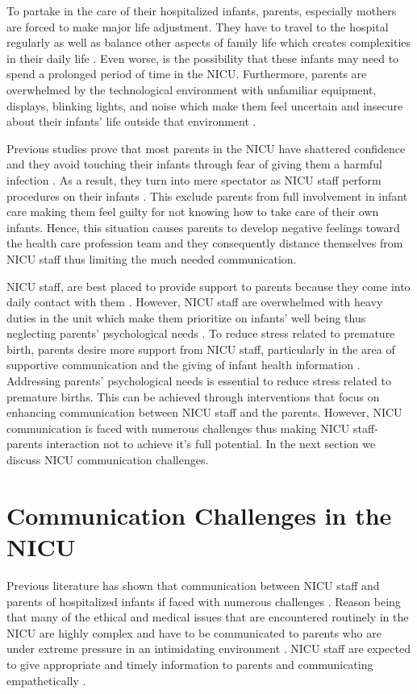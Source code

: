 To partake in the care of their hospitalized infants, parents, especially mothers are forced to make major life adjustment. They have to travel to the hospital regularly as well as balance other aspects of family life which creates complexities in their daily life \citep{Heidari2015a}. Even worse, is the possibility that these infants may need  to  spend  a  prolonged  period  of  time  in  the  NICU. Furthermore, parents are overwhelmed by the technological environment with unfamiliar equipment, displays, blinking lights, and noise which make them feel uncertain and insecure about their infants' life outside that environment \citep{Ionio2016}. 

Previous studies prove that most parents in the NICU have shattered confidence and they avoid touching their infants through fear of giving them a harmful infection \citep{Arnold2013, Ionio2016, Heidari2015a}. As a result, they turn into mere spectator as NICU staff perform procedures on their infants \citep{Araujo2010}. This exclude parents from full involvement in infant care making them feel guilty for not knowing how to take care of their own infants. Hence, this situation causes parents to develop negative feelings toward the health care profession team and they consequently distance themselves from NICU staff thus limiting the much needed communication. 

 NICU staff, are best placed to provide support to parents because they come into daily contact with them \citep{Orzalesi2011, Enlow2017, Mok2006}. However, NICU staff are overwhelmed with heavy duties in the unit which make them prioritize on infants' well being thus neglecting parents' psychological needs \citep{Kadivar2017}. To reduce stress related to premature birth, parents desire more support from NICU staff, particularly in the area of supportive communication and the giving of infant health information \citep{Enke2017}. Addressing parents' psychological needs is essential to reduce stress related to premature births. This can be achieved through interventions that focus on enhancing communication  between NICU staff and the parents. However, NICU communication is faced with numerous challenges thus making  NICU staff-parents interaction not to achieve it's full potential. In the next section we discuss NICU communication challenges.  

\section{Communication Challenges in the NICU}
Previous literature has shown that communication between NICU staff and parents of hospitalized infants if faced with numerous challenges \citep{HadianShirazi2015, Campos2017, Enke2017, Fowlie2007}. Reason being that many of the ethical and medical issues that are encountered routinely in the NICU are highly complex and have to be communicated to parents who are under extreme pressure in an intimidating environment \citep{Enke2017}. NICU staff are expected to give appropriate and timely information to parents and communicating empathetically \citep{Campos2017}. 

